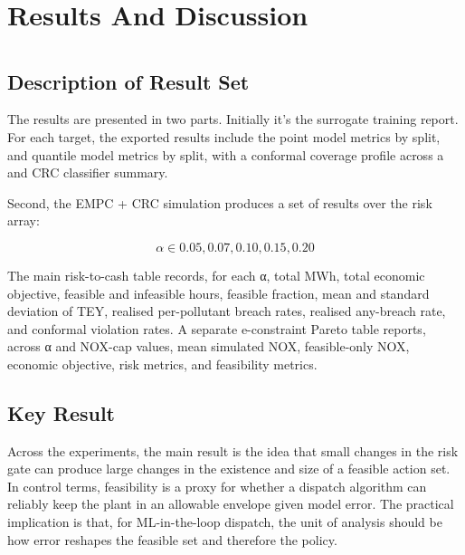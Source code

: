 \documentclass[11pt]{article}
\begin{document}
\section{Results And Discussion}\label{results-and-discussion}

\section{}\label{section-11}

\subsection{Description of Result Set}\label{description-of-result-set}

The results are presented in two parts. Initially it's the surrogate
training report. For each target, the exported results include the point
model metrics by split, and quantile model metrics by split, with a
conformal coverage profile across a and CRC classifier summary.

Second, the EMPC + CRC simulation produces a set of results over the
risk array:

\[\alpha\mathbf{\in}0.05\mathbf{,}0.07\mathbf{,}0.10\mathbf{,}0.15\mathbf{,}0.20\]

The main risk-to-cash table records, for each α, total MWh, total
economic objective, feasible and infeasible hours, feasible fraction,
mean and standard deviation of TEY, realised per-pollutant breach rates,
realised any-breach rate, and conformal violation rates. A separate
e-constraint Pareto table reports, across α and NOX-cap values, mean
simulated NOX, feasible-only NOX, economic objective, risk metrics, and
feasibility metrics.

\subsection{Key Result}\label{key-result}

Across the experiments, the main result is the idea that small changes
in the risk gate can produce large changes in the existence and size of
a feasible action set. In control terms, feasibility is a proxy for
whether a dispatch algorithm can reliably keep the plant in an allowable
envelope given model error. The practical implication is that, for
ML-in-the-loop dispatch, the unit of analysis should be how error
reshapes the feasible set and therefore the policy.
\end{document}
